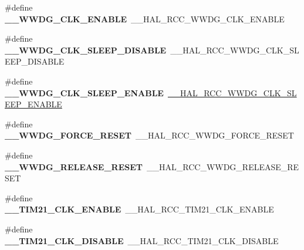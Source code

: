 \begin{DoxyCompactItemize}
\#define {\bfseries \+\_\+\+\_\+\+W\+W\+D\+G\+\_\+\+C\+L\+K\+\_\+\+E\+N\+A\+B\+LE}~\+\_\+\+\_\+\+H\+A\+L\+\_\+\+R\+C\+C\+\_\+\+W\+W\+D\+G\+\_\+\+C\+L\+K\+\_\+\+E\+N\+A\+B\+LE
\item 
\mbox{\label{group___h_a_l___r_c_c___aliased_gac6fa67df82ed82aaafc18a52a39a65a2}} 
\#define {\bfseries \+\_\+\+\_\+\+W\+W\+D\+G\+\_\+\+C\+L\+K\+\_\+\+S\+L\+E\+E\+P\+\_\+\+D\+I\+S\+A\+B\+LE}~\+\_\+\+\_\+\+H\+A\+L\+\_\+\+R\+C\+C\+\_\+\+W\+W\+D\+G\+\_\+\+C\+L\+K\+\_\+\+S\+L\+E\+E\+P\+\_\+\+D\+I\+S\+A\+B\+LE
\item 
\mbox{\label{group___h_a_l___r_c_c___aliased_gafe0cf8a80f682f75863f2058608d0567}} 
\#define {\bfseries \+\_\+\+\_\+\+W\+W\+D\+G\+\_\+\+C\+L\+K\+\_\+\+S\+L\+E\+E\+P\+\_\+\+E\+N\+A\+B\+LE}~\mbox{\hyperlink{group___r_c_c___peripheral___clock___sleep___enable___disable_gaa3978a2e193b921dc24976880dce7a26}{\+\_\+\+\_\+\+H\+A\+L\+\_\+\+R\+C\+C\+\_\+\+W\+W\+D\+G\+\_\+\+C\+L\+K\+\_\+\+S\+L\+E\+E\+P\+\_\+\+E\+N\+A\+B\+LE}}
\item 
\mbox{\label{group___h_a_l___r_c_c___aliased_ga3f066c5b3d2b225967ac2417dae6d569}} 
\#define {\bfseries \+\_\+\+\_\+\+W\+W\+D\+G\+\_\+\+F\+O\+R\+C\+E\+\_\+\+R\+E\+S\+ET}~\+\_\+\+\_\+\+H\+A\+L\+\_\+\+R\+C\+C\+\_\+\+W\+W\+D\+G\+\_\+\+F\+O\+R\+C\+E\+\_\+\+R\+E\+S\+ET
\item 
\mbox{\label{group___h_a_l___r_c_c___aliased_ga068a4fec4a2fd9ca223b4d28a0fbc6b8}} 
\#define {\bfseries \+\_\+\+\_\+\+W\+W\+D\+G\+\_\+\+R\+E\+L\+E\+A\+S\+E\+\_\+\+R\+E\+S\+ET}~\+\_\+\+\_\+\+H\+A\+L\+\_\+\+R\+C\+C\+\_\+\+W\+W\+D\+G\+\_\+\+R\+E\+L\+E\+A\+S\+E\+\_\+\+R\+E\+S\+ET
\item 
\mbox{\label{group___h_a_l___r_c_c___aliased_ga5e5f6e02491ba4544c8e5e788c9914f9}} 
\#define {\bfseries \+\_\+\+\_\+\+T\+I\+M21\+\_\+\+C\+L\+K\+\_\+\+E\+N\+A\+B\+LE}~\+\_\+\+\_\+\+H\+A\+L\+\_\+\+R\+C\+C\+\_\+\+T\+I\+M21\+\_\+\+C\+L\+K\+\_\+\+E\+N\+A\+B\+LE
\item 
\mbox{\label{group___h_a_l___r_c_c___aliased_ga73cc7df88569f682f8f5dafb8fa76fab}} 
\#define {\bfseries \+\_\+\+\_\+\+T\+I\+M21\+\_\+\+C\+L\+K\+\_\+\+D\+I\+S\+A\+B\+LE}~\+\_\+\+\_\+\+H\+A\+L\+\_\+\+R\+C\+C\+\_\+\+T\+I\+M21\+\_\+\+C\+L\+K\+\_\+\+D\+I\+S\+A\+B\+LE

\end{DoxyCompactItemize}
